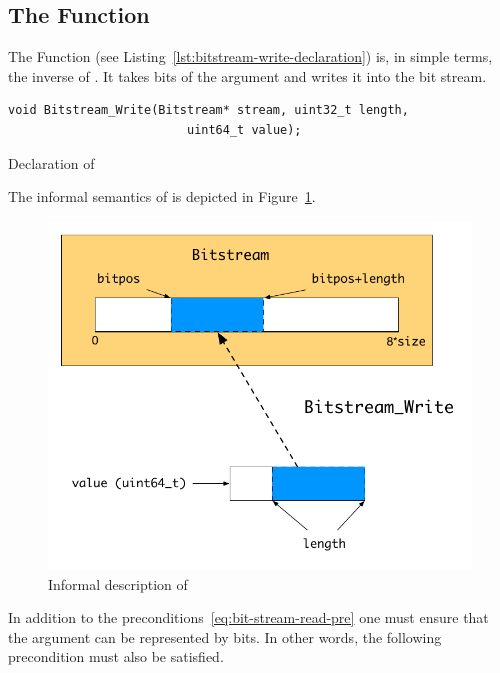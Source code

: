 \clearpage

\subsection{The Function \bitstreamwrite}

The Function \bitstreamwrite (see Listing~\ref{lst:bitstream-write-declaration})
is, in simple terms, the inverse of \bitstreamread.
It takes  bits of the argument  and writes it into the bit stream.

\begin{listing}[hbt]
\begin{lstlisting}[style=acsl-block]
    void Bitstream_Write(Bitstream* stream, uint32_t length, 
                         uint64_t value);
\end{lstlisting}
\caption{\label{lst:bitstream-write-declaration} Declaration of \bitstreamwrite}
\end{listing}

The informal semantics of \bitstreamwrite is depicted in Figure~\ref{fig:bit-stream-write}.

\begin{figure}[hbt]
\begin{center}
\includegraphics[scale=0.85]{Figures/bit-stream-write.pdf}
\caption{Informal description of \bitstreamwrite}
\label{fig:bit-stream-write}
\end{center}
\end{figure}

In addition to the preconditions~\eqref{eq:bit-stream-read-pre} one must ensure
that the argument  can be represented by  bits.
In other words, the following precondition must also be satisfied.

